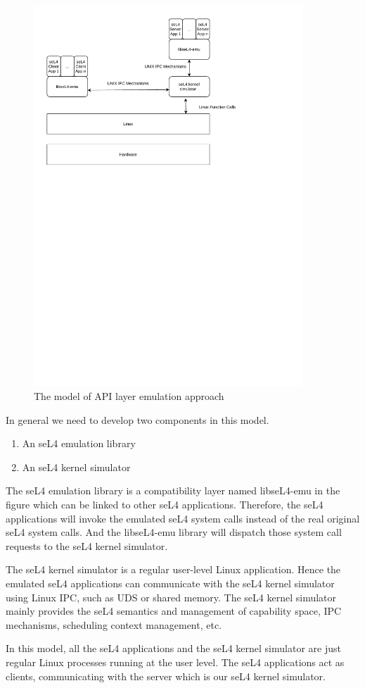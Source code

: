 \begin{figure}[h]
    \centering
    \includegraphics[clip, trim=0.5cm 16cm 3cm 0.5cm, width=0.9\textwidth, height=0.8\textwidth]{ch3/model1-v3.pdf}
    \caption{The model of API layer emulation approach}
    \label{fig:mapi}
\end{figure}

In general we need to develop two components in this model. 

\begin{enumerate}
\item An seL4 emulation library
\item An seL4 kernel simulator
\end{enumerate}

The seL4 emulation library is a compatibility layer named libseL4-emu in the figure which can be linked to other seL4 applications. Therefore, the seL4 applications will invoke the emulated seL4 system calls instead of the real original seL4 system calls. And the libseL4-emu library will dispatch those system call requests to the seL4 kernel simulator. 

The seL4 kernel simulator is a regular user-level Linux application. Hence the emulated seL4 applications can communicate with the seL4 kernel simulator using Linux IPC, such as UDS or shared memory. The seL4 kernel simulator mainly provides the seL4 semantics and management of capability space, IPC mechanisms, scheduling context management, etc. 

In this model, all the seL4 applications and the seL4 kernel simulator are just regular Linux processes running at the user level. The seL4 applications act as clients, communicating with the server which is our seL4 kernel simulator. 

